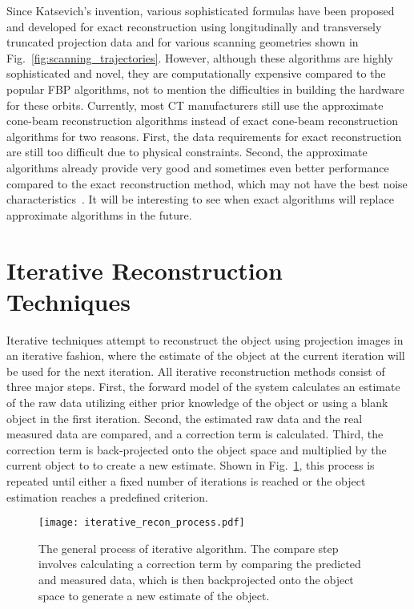 Since Katsevich's invention, various sophisticated formulas have been proposed and developed for exact reconstruction using longitudinally and transversely truncated projection data and for various scanning geometries shown in Fig.~\ref{fig:scanning_trajectories}.  However, although these algorithms are highly sophisticated and novel, they are computationally expensive compared to the popular FBP algorithms, not to mention the difficulties in building the hardware for these orbits.  Currently, most CT manufacturers still use the approximate cone-beam reconstruction algorithms instead of exact cone-beam reconstruction algorithms for two reasons.  First, the data requirements for exact reconstruction are still too difficult due to physical constraints.  Second, the approximate algorithms already provide very good and sometimes even better performance compared to the exact reconstruction method, which may not have the best noise characteristics~\citep{Wang2008}.  It will be interesting to see when exact algorithms will replace approximate algorithms in the future.

\section{Iterative Reconstruction Techniques}
Iterative techniques attempt to reconstruct the object using projection images in an iterative fashion, where the estimate of the object at the current iteration will be used for the next iteration.  All iterative reconstruction methods consist of three major steps.  First, the forward model of the system calculates an estimate of the raw data utilizing either prior knowledge of the object or using a blank object in the first iteration.  Second, the estimated raw data and the real measured data are compared, and a correction term is calculated.  Third, the correction term is back-projected onto the object space and multiplied by the current object to to create a new estimate.  Shown in Fig.~\ref{fig:generalIR}, this process is repeated until either a fixed number of iterations is reached or the object estimation reaches a predefined criterion.
%
\begin{figure}
\centering
\texttt{[image: iterative\_recon\_process.pdf]}
\caption[]{The general process of iterative algorithm\footnotemark.  The compare step involves calculating a correction term by comparing the predicted and measured data, which is then backprojected onto the object space to generate a new estimate of the object.}
\label{fig:generalIR}
\end{figure}

